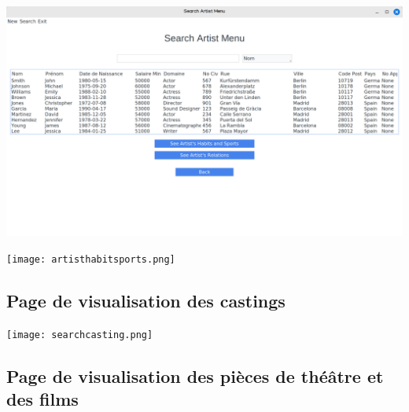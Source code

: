 \documentclass{article}
\begin{document}
\begin{center}
  \includegraphics[scale=0.16]{searchartist.png}
\end{center}

\vspace{5mm}
\begin{center}
  \texttt{[image: artisthabitsports.png]}
\end{center}

\subsection{Page de visualisation des castings}

\begin{center}
  \texttt{[image: searchcasting.png]}
\end{center}

\subsection{Page de visualisation des pièces de théâtre et des films}
\end{document}
